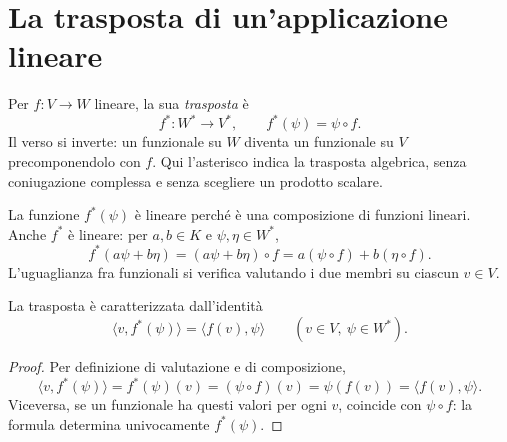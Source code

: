 \section{La trasposta di un'applicazione lineare}
\begin{definizione}
Per $f:V\to W$ lineare, la sua \emph{trasposta} è
\[
 f^*:W^*\longrightarrow V^*,\qquad f^*(\psi)=\psi\circ f.
\]
Il verso si inverte: un funzionale su $W$ diventa un funzionale su $V$ precomponendolo con $f$. Qui l'asterisco indica la trasposta algebrica, senza coniugazione complessa e senza scegliere un prodotto scalare.
\end{definizione}
\begin{schema}
\end{schema}
La funzione $f^*(\psi)$ è lineare perché è una composizione di funzioni lineari. Anche $f^*$ è lineare: per $a,b\in K$ e $\psi,\eta\in W^*$,
\[
 f^*(a\psi+b\eta)=(a\psi+b\eta)\circ f=a(\psi\circ f)+b(\eta\circ f).
\]
L'uguaglianza fra funzionali si verifica valutando i due membri su ciascun $v\in V$.

\begin{proposizione}
La trasposta è caratterizzata dall'identità
\[
 \langle v,f^*(\psi)\rangle=\langle f(v),\psi\rangle
 \qquad(v\in V,\ \psi\in W^*).
\]
\end{proposizione}
\begin{proof}
Per definizione di valutazione e di composizione,
\[
 \langle v,f^*(\psi)\rangle=f^*(\psi)(v)=(\psi\circ f)(v)
 =\psi(f(v))=\langle f(v),\psi\rangle.
\]
Viceversa, se un funzionale ha questi valori per ogni $v$, coincide con $\psi\circ f$: la formula determina univocamente $f^*(\psi)$.
\end{proof}

